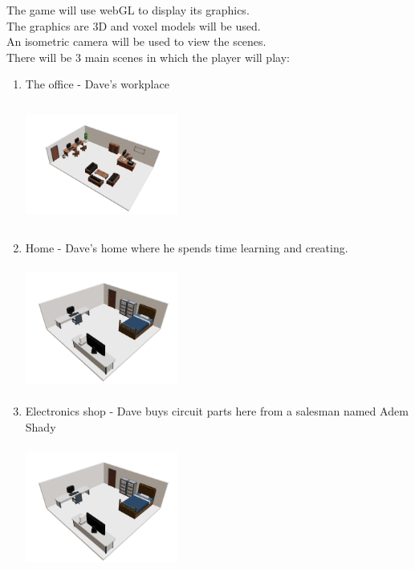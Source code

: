 \documentclass[12pt]{article}
\begin{document}
The game will use webGL to display its graphics.\\
The graphics are 3D and voxel models will be used.\\
An isometric camera will be used to view the scenes.\\
There will be 3 main scenes in which the player will play:\\
\begin{enumerate}
    \item The office - Dave's workplace
          \begin{center}
              \includegraphics[width=5cm, height=4cm]{office.png}
          \end{center}
    \item Home - Dave's home where he spends time learning and creating.
          \begin{center}
              \includegraphics[width=5cm, height=4cm]{home.png}
          \end{center}
    \item Electronics shop - Dave buys circuit parts here from a salesman named Adem Shady
          \begin{center}
              \includegraphics[width=5cm, height=4cm]{home.png}
          \end{center}
\end{enumerate}
\end{document}
